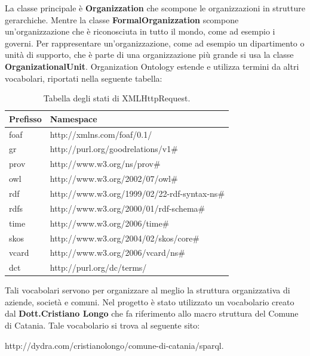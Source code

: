 \documentclass[a4paper,11pt]{article}
\begin{document}
\begin{enumerate}
\begin{enumerate}[label*=\arabic*.]
\medskip

La classe principale è \textbf{Organizzation} che scompone le organizzazioni in strutture gerarchiche.
Mentre la classe \textbf{FormalOrganizzation} scompone un'organizzazione che è riconosciuta in tutto il mondo, come ad esempio i governi.
Per rappresentare un'organizzazione, come ad esempio un dipartimento o unità di supporto, che è parte di una organizzazione più grande si usa la classe \textbf{OrganizationalUnit}.
Organization Ontology estende e utilizza termini da altri vocabolari, riportati nella seguente tabella:
\begin{table}[!htb]
		\begin{center}				
		\begin{tabular}{|>{\small}l|>{\small}l|}
				\hline
				\textbf{Prefisso} & \textbf{Namespace}\\				
				\hline
				foaf & http://xmlns.com/foaf/0.1/\\
				\hline
				gr & http://purl.org/goodrelations/v1\#\\
				\hline
				prov & http://www.w3.org/ns/prov\#\\
				\hline
				owl & http://www.w3.org/2002/07/owl\#\\
				\hline
				rdf & http://www.w3.org/1999/02/22-rdf-syntax-ns\#\\
				\hline
				rdfs & http://www.w3.org/2000/01/rdf-schema\#\\			
				\hline
				time & http://www.w3.org/2006/time\#\\
				\hline
				skos & http://www.w3.org/2004/02/skos/core\#\\					
				\hline
				vcard & http://www.w3.org/2006/vcard/ns\#\\											\hline
				dct & http://purl.org/dc/terms/\\			
				\hline
		\end{tabular}	
		\caption{Tabella degli stati di XMLHttpRequest.}	
		\end{center}	
	\end{table}\newpage
Tali vocabolari servono per organizzare al meglio la struttura organizzativa di aziende, società e comuni.
Nel progetto è stato utilizzato un vocabolario creato dal \textbf{Dott.Cristiano Longo} che fa riferimento allo macro struttura del Comune di Catania.
Tale vocabolario si trova al seguente sito:
\medskip

http://dydra.com/cristianolongo/comune-di-catania/sparql.

\medskip


\end{enumerate}
\end{enumerate}
\end{document}
